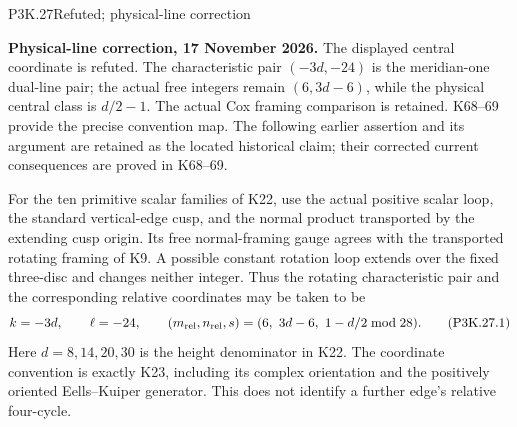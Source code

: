 \begin{statement}{P3K.27}{Refuted; physical-line correction}\par\noindent\textbf{Physical-line correction, 17 November 2026.} The displayed central coordinate is refuted. The characteristic pair \((-3d,-24)\) is the meridian-one dual-line pair; the actual free integers remain \((6,3d-6)\), while the physical central class is \(d/2-1\). The actual Cox framing comparison is retained. K68--69 provide the precise convention map. The following earlier assertion and its argument are retained as the located historical claim; their corrected current consequences are proved in K68--69.\medskip\par 
For the ten primitive scalar families of K22, use the actual
positive scalar loop, the standard vertical-edge cusp, and the
normal product transported by the extending cusp origin. Its
free normal-framing gauge agrees with the transported rotating
framing of K9. A possible constant rotation loop extends over
the fixed three-disc and changes neither integer. Thus the
rotating characteristic pair and the corresponding relative
coordinates may be taken to be
\[
       k=-3d,\qquad \ell=-24,\qquad
       (m_{\rm rel},n_{\rm rel},s)
             =(6,\ 3d-6,\ 1-d/2\bmod28).
                                                        \tag{P3K.27.1}
\]
Here \(d=8,14,20,30\) is the height denominator in K22. The
coordinate convention is exactly K23, including its complex
orientation and the positively oriented Eells--Kuiper generator.
This does not identify a further edge's relative four-cycle.
\end{statement}
